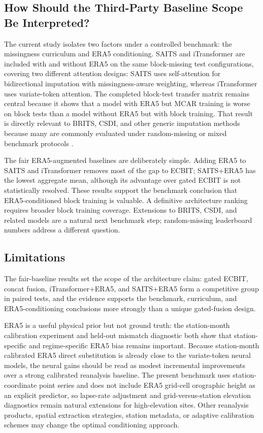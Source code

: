 \subsection{How Should the Third-Party Baseline Scope Be Interpreted?}
The current study isolates two factors under a controlled benchmark: the missingness curriculum and ERA5 conditioning. SAITS and iTransformer are included with and without ERA5 on the same block-missing test configurations, covering two different attention designs: SAITS uses self-attention for bidirectional imputation with missingness-aware weighting, whereas iTransformer uses variate-token attention. The completed block-test transfer matrix remains central because it shows that a model with ERA5 but MCAR training is worse on block tests than a model without ERA5 but with block training. That result is directly relevant to BRITS, CSDI, and other generic imputation methods because many are commonly evaluated under random-missing or mixed benchmark protocols \citep{fang2020imputationsurvey,wang2024imputationsurvey,du2024tsibench}.

The fair ERA5-augmented baselines are deliberately simple. Adding ERA5 to SAITS and iTransformer removes most of the gap to ECBIT; SAITS+ERA5 has the lowest aggregate mean, although its advantage over gated ECBIT is not statistically resolved. These results support the benchmark conclusion that ERA5-conditioned block training is valuable. A definitive architecture ranking requires broader block training coverage. Extensions to BRITS, CSDI, and related models are a natural next benchmark step; random-missing leaderboard numbers address a different question.

\subsection{Limitations}
The fair-baseline results set the scope of the architecture claim: gated ECBIT, concat fusion, iTransformer+ERA5, and SAITS+ERA5 form a competitive group in paired tests, and the evidence supports the benchmark, curriculum, and ERA5-conditioning conclusions more strongly than a unique gated-fusion design.

ERA5 is a useful physical prior but not ground truth: the station-month calibration experiment and held-out mismatch diagnostic both show that station-specific and regime-specific ERA5 bias remains important. Because station-month calibrated ERA5 direct substitution is already close to the variate-token neural models, the neural gains should be read as modest incremental improvements over a strong calibrated reanalysis baseline. The present benchmark uses station-coordinate point series and does not include ERA5 grid-cell orographic height as an explicit predictor, so lapse-rate adjustment and grid-versus-station elevation diagnostics remain natural extensions for high-elevation sites. Other reanalysis products, spatial extraction strategies, station metadata, or adaptive calibration schemes may change the optimal conditioning approach.

